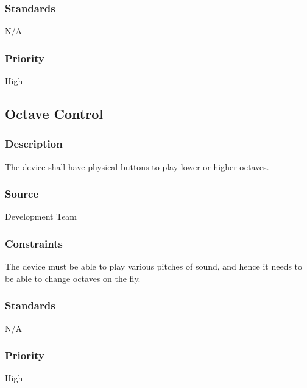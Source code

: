 \subsubsection{Standards}
N/A
\subsubsection{Priority}
High

\subsection{Octave Control}
\subsubsection{Description}
The device shall have physical buttons to play lower or higher octaves.
\subsubsection{Source}
Development Team
\subsubsection{Constraints}
The device must be able to play various pitches of sound, and hence it needs to be able to change octaves on the fly. 
\subsubsection{Standards}
N/A
\subsubsection{Priority}
High
